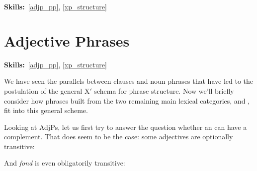 \documentclass{article}
\begin{document}
\maketitle
\subtitle{Topic 8 Course Notes: Nonverbal XP's Part 2\\
AdjP, PP, \& Headedness}
\hfill{}\textbf{Skills:}~\ref{adjp_pp},
\ref{xp_structure}

\section{Adjective Phrases}
\hfill{}\textbf{Skills:}~\ref{adjp_pp},
\ref{xp_structure}

We have seen the parallels between clauses and noun phrases that have led to the postulation of the general X$'$ schema for phrase structure. Now we'll briefly consider how phrases built from the two remaining main lexical categories,  and , fit into this general scheme.

Looking at AdjPs, let us first try to answer the question whether an  can have a complement. That does seem to be the case: some adjectives are optionally transitive:
\begin{exe}
    \label{adj_of_on}
\end{exe}
And \emph{fond} is even obligatorily transitive:
\begin{exe}
    \label{fond}
\end{exe}
\end{document}
